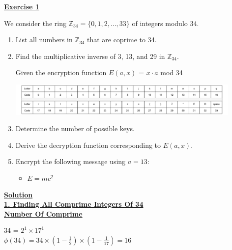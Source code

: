 \begin{center}
    \Huge{\textbf{\underline{Exercise 1}}}
\end{center}

\vspace{0.6cm}

We consider the ring \( \mathbb{Z}_{34} = \{0,1,2,\dots,33\} \) of integers modulo 34.

\begin{enumerate}
    \item List all numbers in \( \mathbb{Z}_{34} \) that are coprime to 34.
    \item Find the multiplicative inverse of 3, 13, and 29 in \( \mathbb{Z}_{34} \).

Given the encryption function \(E(a, x)\) = \(x \cdot a\) mod 34

\begin{center}
    \includegraphics[width=0.9\textwidth]{Exercices/EX1/ex1.tab.drawio.pdf}
\end{center}



    \item Determine the number of possible keys.
    \item Derive the decryption function corresponding to \( E(a, x) \).
    \item Encrypt the following message using \( a = 13 \):  
        \begin{itemize}
            \item \( E = mc^2 \)
        \end{itemize}
\end{enumerate}


\vspace{1cm}
\textbf{\underline{\Large{Solution}}}\\[0.15cm]
\textbf{\underline{1. Finding All Comprime Integers Of 34}}\\[0.15cm]
\textbf{\underline{Number Of Comprime}}
\vspace{0.35cm}

\begin{center}
    34 = \(2^1 \times 17^1\)\\[0.2cm]
\(\phi(34) = 34 \times \left(1 - \frac{1}{2}\right) \times \left(1 - \frac{1}{17}\right) = \boxed{16}\)
\end{center}

